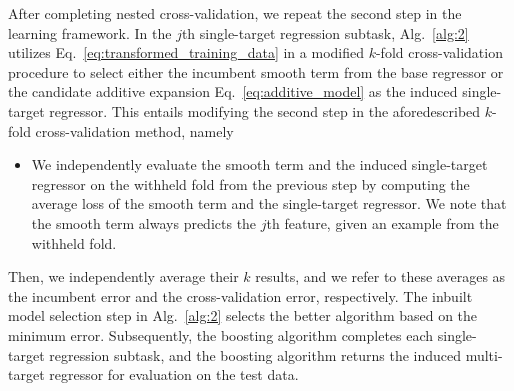 \documentclass[aps,twocolumn,superscriptaddress,floatfix,preprintnumbers,showkeys]{revtex4}
\begin{document}
After completing nested cross-validation, we repeat the second step in the learning framework. In the $j$th single-target regression subtask, Alg.~\ref{alg:2} utilizes Eq.~\ref{eq:transformed_training_data} in a modified $k$-fold cross-validation procedure to select either the incumbent smooth term from the base regressor or the candidate additive expansion Eq.~\ref{eq:additive_model} as the induced single-target regressor. This entails modifying the second step in the aforedescribed $k$-fold cross-validation method, namely
\begin{itemize}
\item We independently evaluate the smooth term and the induced single-target regressor on the withheld fold from the previous step by computing the average loss of the smooth term and the single-target regressor. We note that the smooth term always predicts the $j$th feature, given an example from the withheld fold.
\end{itemize}
Then, we independently average their $k$ results, and we refer to these averages as the incumbent error and the cross-validation error, respectively. The inbuilt model selection step in Alg.~\ref{alg:2} selects the better algorithm based on the minimum error. Subsequently, the boosting algorithm completes each single-target regression subtask, and the boosting algorithm returns the induced multi-target regressor for evaluation on the test data.
\end{document}
